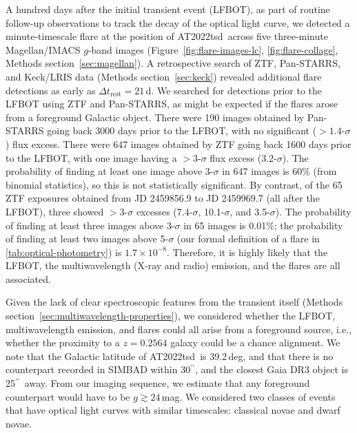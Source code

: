 \documentclass{nature_plusfigure}
\newcommand{\at}{AT2022tsd}
\newcommand{\arcsec}{$^{\prime\prime}$}
\begin{document}
\begin{methods}
A hundred days after the initial transient event (LFBOT), as part of routine follow-up observations to track the decay of the optical light curve, we detected\cite{Ho2022_Flares} a minute-timescale flare at the position of \at\ across five three-minute Magellan/IMACS $g$-band images (Figure~\ref{fig:flare-images-lc}, \ref{fig:flare-collage}, Methods section~\ref{sec:magellan}). A retrospective search of ZTF, Pan-STARRS, and Keck/LRIS data (Methods section~\ref{sec:keck}) revealed additional flare detections as early as $\Delta t_\mathrm{rest}=21\,$d. We searched for detections prior to the LFBOT using ZTF and Pan-STARRS, as might be expected if the flares arose from a foreground Galactic object. There were 190 images obtained by Pan-STARRS going back 3000 days prior to the LFBOT, with no significant ($>1.4$-$\sigma$) flux excess\cite{Fulton2022}. There were 647 images obtained by ZTF going back 1600 days prior to the LFBOT, with one image having a $>3$-$\sigma$ flux excess (3.2-$\sigma$). The probability of finding at least one image above 3-$\sigma$ in 647 images is 60\% (from binomial statistics), so this is not statistically significant. By contrast, of the 65 ZTF exposures obtained from JD 2459856.9 to JD 2459969.7 (all after the LFBOT), three showed $>3$-$\sigma$ excesses (7.4-$\sigma$, 10.1-$\sigma$, and 3.5-$\sigma$). The probability of finding at least three images above 3-$\sigma$ in 65 images is 0.01\%; the probability of finding at least two images above 5-$\sigma$ (our formal definition of a flare in \ref{tab:optical-photometry}) is $1.7\times10^{-8}$. Therefore, it is highly likely that the LFBOT, the multiwavelength (X-ray and radio) emission, and the flares are all associated. 


Given the lack of clear spectroscopic features from the transient itself (Methods section~\ref{sec:multiwavelength-properties}), we considered whether the LFBOT, multiwavelength emission, and flares could all arise from a foreground source, i.e., whether the proximity to a $z=0.2564$ galaxy could be a chance alignment. 
We note that the Galactic latitude of \at\ is 39.2\,deg, and that there is no counterpart recorded in SIMBAD within 30\arcsec, and the closest Gaia DR3 object is 25\arcsec\ away. From our imaging sequence, we estimate that any foreground counterpart would have to be $g \gtrsim 24\,$mag. We considered two classes of events that have optical light curves with similar timescales: classical novae and dwarf novae.


\end{methods}
\end{document}
